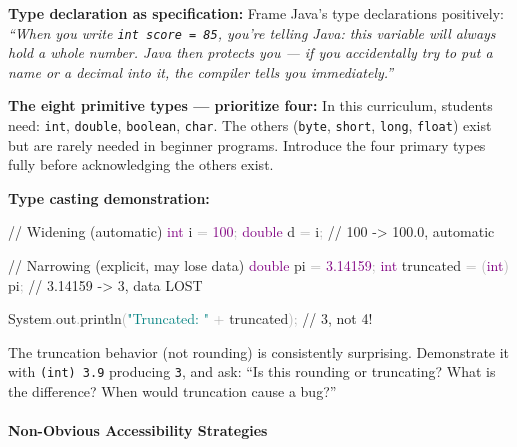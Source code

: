 \documentclass[
  justified,
  openright,
]{tufte-book}
\let\paragraph\paragraph
\newcommand{\BuiltInTok}[1]{#1}
\newcommand{\CommentTok}[1]{\textcolor{MidGray}{#1}}
\newcommand{\DataTypeTok}[1]{\textcolor{Purple}{#1}}
\newcommand{\DecValTok}[1]{\textcolor{Purple}{#1}}
\newcommand{\FloatTok}[1]{\textcolor{Purple}{#1}}
\newcommand{\FunctionTok}[1]{\textcolor{BrandBlue}{#1}}
\newcommand{\NormalTok}[1]{#1}
\newcommand{\OperatorTok}[1]{\textcolor{DarkGray}{#1}}
\newcommand{\StringTok}[1]{\textcolor{Teal}{#1}}
\newenvironment{Shaded}{%
  \begin{snugshade}
}{%
  \end{snugshade}
}
\let\paragraph\paragraph
\begin{document}
\textbf{Type declaration as specification:} Frame Java's type
declarations positively: \emph{``When you write
\texttt{int\ score\ =\ 85}, you're telling Java: this variable will
always hold a whole number. Java then protects you --- if you
accidentally try to put a name or a decimal into it, the compiler tells
you immediately.''}

\textbf{The eight primitive types --- prioritize four:} In this
curriculum, students need: \texttt{int}, \texttt{double},
\texttt{boolean}, \texttt{char}. The others (\texttt{byte},
\texttt{short}, \texttt{long}, \texttt{float}) exist but are rarely
needed in beginner programs. Introduce the four primary types fully
before acknowledging the others exist.

\textbf{Type casting demonstration:}

\begin{Shaded}
\begin{Highlighting}[]
\CommentTok{// Widening (automatic)}
\DataTypeTok{int}\NormalTok{ i }\OperatorTok{=} \DecValTok{100}\OperatorTok{;}
\DataTypeTok{double}\NormalTok{ d }\OperatorTok{=}\NormalTok{ i}\OperatorTok{;}   \CommentTok{// 100 {-}\textgreater{} 100.0, automatic}

\CommentTok{// Narrowing (explicit, may lose data)}
\DataTypeTok{double}\NormalTok{ pi }\OperatorTok{=} \FloatTok{3.14159}\OperatorTok{;}
\DataTypeTok{int}\NormalTok{ truncated }\OperatorTok{=} \OperatorTok{(}\DataTypeTok{int}\OperatorTok{)}\NormalTok{ pi}\OperatorTok{;}  \CommentTok{// 3.14159 {-}\textgreater{} 3, data LOST}

\BuiltInTok{System}\OperatorTok{.}\FunctionTok{out}\OperatorTok{.}\FunctionTok{println}\OperatorTok{(}\StringTok{"Truncated: "} \OperatorTok{+}\NormalTok{ truncated}\OperatorTok{);}  \CommentTok{// 3, not 4!}
\end{Highlighting}
\end{Shaded}

The truncation behavior (not rounding) is consistently surprising.
Demonstrate it with \texttt{(int)\ 3.9} producing \texttt{3}, and ask:
``Is this rounding or truncating? What is the difference? When would
truncation cause a bug?''

\paragraph{Non-Obvious Accessibility
Strategies}\label{non-obvious-accessibility-strategies}
\end{document}
